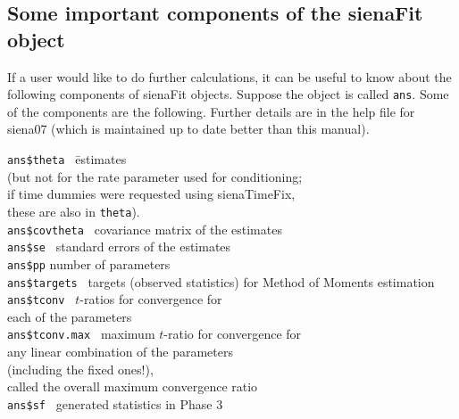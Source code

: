 \documentclass[a4paper,fleqn,11pt]{article}
\newcommand{\+}{\, + \,}
\begin{document}
\subsection{Some important components of the \textsf{sienaFit} object}
\label{S_fitcomp}

If a user would like to do further calculations, it can be
useful to know about the following components of  \textsf{sienaFit} objects.
Suppose the object is called \texttt{ans}. Some of the components
are the following.
Further details are in the help file for \textsf{siena07}
(which is maintained up to date better than this manual).

\begin{tabbing}
 \texttt{ans\$theta  }\hspace{3em}    \=  estimates  \\
                                      \> (but not for the rate parameter used
                                                       for conditioning;\\
                                      \> if time dummies were requested using
                                            \textsf{sienaTimeFix},\\
                                      \> these are also in \texttt{theta}). \\
 \texttt{ans\$covtheta   }            \> covariance matrix of the estimates \\
 \texttt{ans\$se   }               \> standard errors of the estimates \\
 \texttt{ans\$pp}                     \> number of parameters  \\
 \texttt{ans\$targets }               \> targets (observed statistics)
                                         for Method of Moments estimation  \\
 \texttt{ans\$tconv   }               \> $t$-ratios for convergence for \\
                                       \> each of the parameters\\
 \texttt{ans\$tconv.max   }         \> maximum $t$-ratio for convergence for \\
                                 \> any linear combination of the parameters\\
                                 \> (including the fixed ones!),\\
                             \> called the overall maximum convergence ratio \\
 \texttt{ans\$sf    }                 \>  generated statistics in Phase 3 \\

\end{tabbing}
\end{document}
